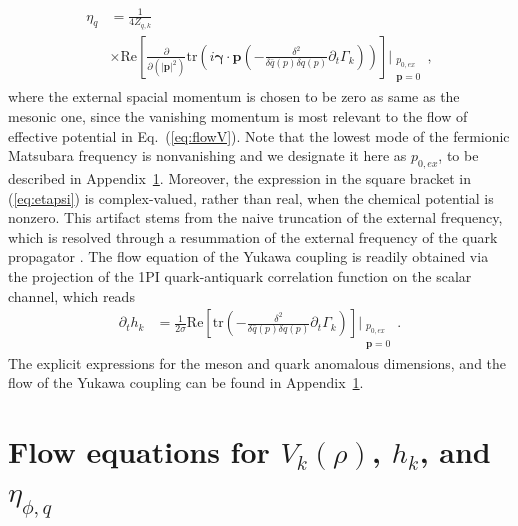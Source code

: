 \documentclass[%
reprint,
superscriptaddress,
showpacs,preprintnumbers,
amsmath,amssymb,
aps,
prd,
]{revtex4-1}
\def\Eq#1{Eq.~(\ref{#1})}
\def\eq#1{(\ref{#1})}
\def\app#1{Appendix~\ref{#1}}
\begin{document}
%
\begin{align}
\eta_{q}&=\frac{1}{4 Z_{q,k}}\nonumber\\[2ex]
&\times\mathrm{Re}\left[\frac{\partial}{\partial (|\bm{p}|^2)}\mathrm{tr}
\left(i \bm{\gamma}\cdot\bm{p}\left(-\frac{\delta^2}{\delta\bar{q}(p)
\delta q(p)}\partial_t \Gamma_k\right)\right)\right]\Bigg|_{\substack{p_{0,ex}\\ \bm{p}=0}}\,,  \label{eq:etapsi}
\end{align}
%
where the external spacial momentum is chosen to be zero as same as the mesonic one, since the vanishing momentum is most relevant to the flow of effective potential in \Eq{eq:flowV}. Note that the lowest mode of the fermionic Matsubara frequency is nonvanishing and we designate it here as $p_{0,ex}$, to be described in \app{app:flowV}. Moreover, the expression in the square bracket in \eq{eq:etapsi} is complex-valued, rather than real, when the chemical potential is nonzero. This artifact stems from the naive truncation of the external frequency, which is resolved through a resummation of the external frequency of the quark propagator \cite{Fu:2016tey}. The flow equation of the Yukawa coupling is readily obtained via the projection of the 1PI quark-antiquark correlation function on the scalar channel, which reads
%
\begin{align}
\partial_t h_k&=\frac{1}{2 \sigma}\mathrm{Re}\left[\mathrm{tr}\left(-\frac{\delta^2}{\delta\bar{q}(p)
\delta q(p)}\partial_t \Gamma_k\right)\right]\Bigg|_{\substack{p_{0,ex}\\ \bm{p}=0}}\,.  \label{eq:dth}
\end{align}
%
The explicit expressions for the meson and quark anomalous dimensions, and the flow of the Yukawa coupling can be found in \app{app:flowV}.
	
	
\section{Flow equations for $V_k(\rho)$, $h_k$, and $\eta_{\phi,q}$}\label{app:flowV}
	
\end{document}
